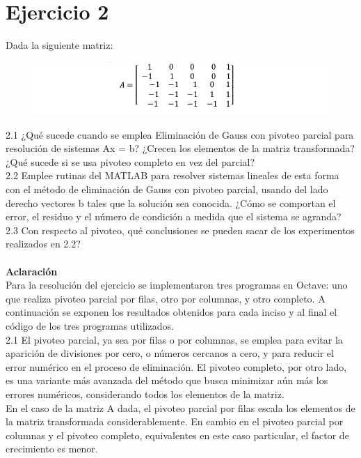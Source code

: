 \documentclass{article}
\begin{document}
\section{Ejercicio 2}
Dada la siguiente matriz:

\begin{figure}[H]
    \centering
    \includegraphics[width=1\linewidth]{Screenshot_20231008_190326.png}
    \label{fig:enter-label}
\end{figure}

2.1 ¿Qué sucede cuando se emplea Eliminación de Gauss con pivoteo parcial para
resolución de sistemas Ax = b? ¿Crecen los elementos de la matriz transformada? ¿Qué
sucede si se usa pivoteo completo en vez del parcial?\\
2.2 Emplee rutinas del MATLAB para resolver sistemas lineales de esta forma con el
método de eliminación de Gauss con pivoteo parcial, usando del lado derecho vectores
b tales que la solución sea conocida. ¿Cómo se comportan el error, el residuo y el
número de condición a medida que el sistema se agranda?\\
2.3 Con respecto al pivoteo, qué conclusiones se pueden sacar de los experimentos
realizados en 2.2? \\\\
\textbf{Aclaración}\\
Para la resolución del ejercicio se implementaron tres programas en Octave: uno que realiza pivoteo parcial por filas, otro por columnas, y otro completo. A continuación se exponen los resultados obtenidos para cada inciso y al final el código de los tres programas utilizados.\\

2.1 
El pivoteo parcial, ya sea por filas o por columnas, se emplea para evitar la aparición de divisiones por cero, o números cercanos a cero, y para reducir el error numérico en el proceso de eliminación. El pivoteo completo, por otro lado, es una variante más avanzada del método que busca minimizar aún más los errores numéricos, considerando todos los elementos de la matriz.\\ 

En el caso de la matriz A dada, el pivoteo parcial por filas escala los elementos de la matriz transformada considerablemente. En cambio en el pivoteo parcial por columnas y el pivoteo completo, equivalentes en este caso particular, el factor de crecimiento es menor.\\
\end{document}
